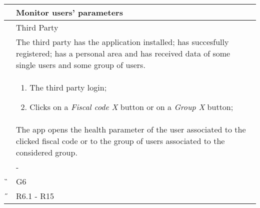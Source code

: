 \begin{center}
	\begin{longtable}{ | p{} | p{} | }
		\hline
		 \A &  Monitor users' parameters\\ 

		\hline
		 \B &  Third Party \\ 

		\hline
  		 \C &  The third party has the application installed; has succesfully registered; has a personal area and has received data of some single users and some group of users.\\

		\hline
		\D & \begin{enumerate}
			\item The third party login;
			\item Clicks on a \textit{Fiscal code X} button or on a \textit{Group X} button;
		\end{enumerate} \\

		\hline
		\E & The app opens the health parameter of the user associated to the clicked fiscal code or to the group of users associated to the considered group.\\

		\hline
		\F & - \\
		
		\hline
		\G & G6\\

		\hline
		\H & R6.1 - R15 \\
		\hline

	\end{longtable}
\end{center}